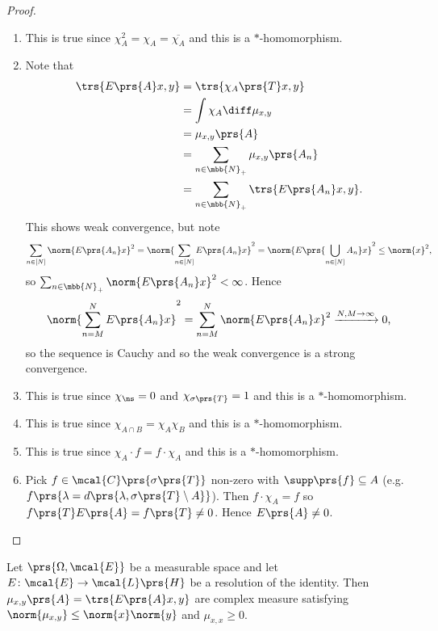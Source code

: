\documentclass[10pt, twoside]{book}
\begin{document}
\begin{proof}
\begin{enumerate}
\item This is true since $\chi_A^2 = \chi_A = \overline{\chi_A}$ and this is a $*$-homomorphism.
\item Note that
\begin{align*}
\trs{E\prs{A} x, y} &= \trs{\chi_A\prs{T} x, y}
\\&= \int \chi_A \diff \mu_{x,y}
\\&= \mu_{x,y} \prs{A}
\\&=\sum_{n \in \mbb{N}_+} \mu_{x,y} \prs{A_n}
\\&= \sum_{n \in \mbb{N}_+} \trs{E\prs{A_n} x, y} \text{.}
\end{align*}
This shows weak convergence, but note
\begin{align*}
\sum_{n \in [N]} \norm{E\prs{A_n} x}^2 = \norm{\sum_{n \in [N]} E\prs{A_n} x}^2 = \norm{E\prs{\bigcup_{n \in [N]} A_n} x}^2 \leq \norm{x}^2 \text{,}
\end{align*}
so $\sum_{n \in \mbb{N}_+} \norm{E\prs{A_n} x}^2 < \infty$.
Hence
\[\norm{\sum_{n = M}^N E\prs{A_n} x}^2 = \sum_{n=M}^N \norm{E\prs{A_n} x}^2 \xrightarrow{N,M \to \infty} 0 \text{,}\]
so the sequence is Cauchy and so the weak convergence is a strong convergence.
\item This is true since $\chi_\ns = 0$ and $\chi_{\sigma\prs{T}} = 1$ and this is a $*$-homomorphism.
\item This is true since $\chi_{A \cap B} = \chi_A \chi_B$ and this is a $*$-homomorphism.
\item This is true since $\chi_A \cdot f = f \cdot \chi_A$ and this is a $*$-homomorphism.
\item Pick $f \in \mcal{C}\prs{\sigma\prs{T}}$ non-zero with $\supp\prs{f} \subseteq A$ (e.g. $f\prs{\lambda = d \prs{\lambda, \sigma\prs{T} \setminus A}}$).
Then $f \cdot \chi_A = f$ so $f\prs{T} E\prs{A} = f\prs{T} \neq 0$.
Hence $E\prs{A} \neq 0$.
\end{enumerate}
\end{proof}

\begin{proposition}
Let $\prs{\Omega, \mcal{E}}$ be a measurable space and let $E \colon \mcal{E} \to \mcal{L}\prs{H}$ be a resolution of the identity. Then $\mu_{x,y}\prs{A} = \trs{E\prs{A} x,y}$ are complex measure satisfying $\norm{\mu_{x,y}} \leq \norm{x} \norm{y}$ and $\mu_{x,x} \geq 0$.
\end{proposition}
\end{document}
